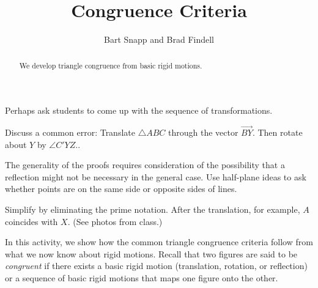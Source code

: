 \documentclass[nooutcomes]{ximera}
\title{Congruence Criteria}
\author{Bart Snapp and Brad Findell}
\begin{document}
\begin{abstract}
    We develop triangle congruence from basic rigid motions.  
\end{abstract}
\maketitle

\begin{teachingnote}
Perhaps ask students to come up with the sequence of transformations. 

Discuss a common error:   Translate $\triangle ABC$ through the vector $\overrightarrow{BY}$.  Then rotate about $Y$ by $\angle C'YZ.$. 

The generality of the proofs requires consideration of the possibility that a reflection might not be necessary in the general case.  Use half-plane ideas to ask whether points are on the same side or opposite sides of lines.  

Simplify by eliminating the prime notation.  After the translation, for example, $A$ coincides with $X$.  (See photos from class.)
\end{teachingnote}

In this activity, we show how the common triangle congruence criteria follow from
 what we now know about rigid motions.  
 Recall that two figures are said to be 
\emph{congruent} if there exists a basic rigid motion (translation, rotation, or reflection) or a 
sequence of basic rigid motions that maps one figure onto the other.  
\end{document}
